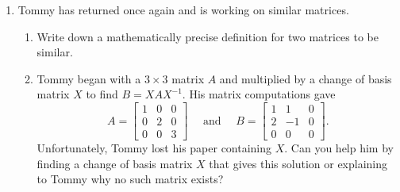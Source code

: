 \documentclass[red]{tutorial}
\newcommand{\mat}[1]{\begin{bmatrix}#1\end{bmatrix}}
\theoremstyle{definition}
\theoremstyle{theorem}
\begin{document}
\begin{tutorial}
\begin{enumerate}
	\item Tommy has returned once again and is working on similar matrices.  
	\begin{enumerate}
		\item Write down a mathematically precise definition for two matrices to be similar.

\item 
Tommy began with a $3\times 3$ matrix $A$ and multiplied by a change of basis matrix $X$ to find $B=XAX^{-1}$. His matrix computations gave 
			\[A=\mat{
1 & 0 & 0  \\
0 & 2 & 0 \\
0 & 0 & 3 
}\quad \text{ and } \quad
			B=\mat{
1 & 1 & 0  \\
2 & -1 & 0 \\
0 & 0 & 0 
}.
\]
	Unfortunately, Tommy lost his paper containing $X$. 
			Can you help him by finding a change of basis matrix
			$X$ that gives this solution or explaining to Tommy why no such matrix exists? 
		\end{enumerate}
\end{enumerate}
	\end{tutorial}
\end{document}
